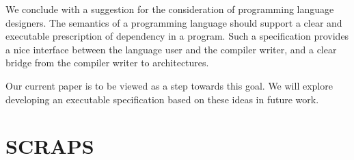 We conclude with a suggestion for the consideration of programming language
designers.  The semantics of a programming language should support a clear
and executable prescription of dependency in a program.  Such a specification
provides a nice interface between the language user and the compiler writer,
and a clear bridge from the compiler writer to architectures.

Our current paper is to be viewed as a step towards this goal.  We will
explore developing an executable specification based on these ideas in future
work.
 


\section{SCRAPS}

